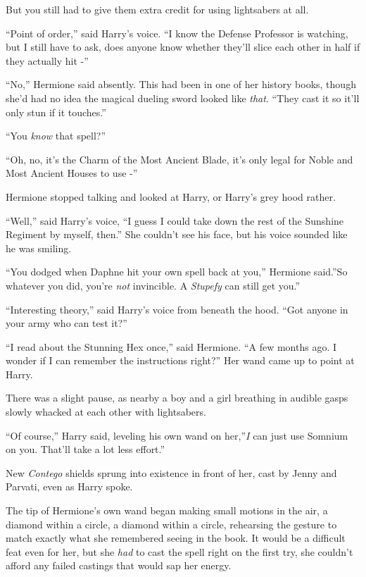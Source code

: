 But you still had to give them extra credit for using lightsabers at
all.

``Point of order,'' said Harry's voice. ``I know the Defense Professor
is watching, but I still have to ask, does anyone know whether they'll
slice each other in half if they actually hit -''

``No,'' Hermione said absently. This had been in one of her history
books, though she'd had no idea the magical dueling sword looked like
\emph{that}. ``They cast it so it'll only stun if it touches.''

``You \emph{know} that spell?''

``Oh, no, it's the Charm of the Most Ancient Blade, it's only legal for
Noble and Most Ancient Houses to use -''

Hermione stopped talking and looked at Harry, or Harry's grey hood
rather.

``Well,'' said Harry's voice, ``I guess I could take down the rest of
the Sunshine Regiment by myself, then.'' She couldn't see his face, but
his voice sounded like he was smiling.

``You dodged when Daphne hit your own spell back at you,'' Hermione
said.''So whatever you did, you're \emph{not} invincible. A
\emph{Stupefy} can still get you.''

``Interesting theory,'' said Harry's voice from beneath the hood. ``Got
anyone in your army who can test it?''

``I read about the Stunning Hex once,'' said Hermione. ``A few months
ago. I wonder if I can remember the instructions right?'' Her wand came
up to point at Harry.

There was a slight pause, as nearby a boy and a girl breathing in
audible gasps slowly whacked at each other with lightsabers.

``Of course,'' Harry said, leveling his own wand on her,''\emph{I} can
just use Somnium on you. That'll take a lot less effort.''

New \emph{Contego} shields sprung into existence in front of her, cast
by Jenny and Parvati, even as Harry spoke.

The tip of Hermione's own wand began making small motions in the air, a
diamond within a circle, a diamond within a circle, rehearsing the
gesture to match exactly what she remembered seeing in the book. It
would be a difficult feat even for her, but she \emph{had} to cast the
spell right on the first try, she couldn't afford any failed castings
that would sap her energy.

